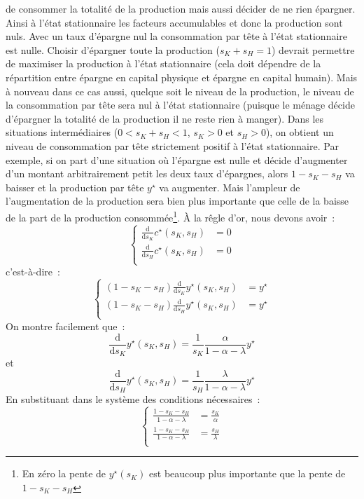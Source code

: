 \documentclass[10pt,a4paper,notitlepage,twocolumn]{article}
\begin{document}
de consommer la totalité de la production mais aussi décider de ne
rien épargner. Ainsi à l'état stationnaire les facteurs accumulables
et donc la production sont nuls. Avec un taux d'épargne nul la
consommation par tête à l'état stationnaire est nulle. Choisir
d'épargner toute la production ($s_K+s_H=1$) devrait permettre de
maximiser la production à l'état stationnaire (cela doit dépendre de
la répartition entre épargne en capital physique et épargne en capital
humain). Mais à nouveau dans ce cas aussi, quelque soit le niveau de
la production, le niveau de la consommation par tête sera nul à l'état
stationnaire (puisque le ménage décide d'épargner la totalité de la
production il ne reste rien à manger). Dans les situations
intermédiaires ($0<s_K+s_H<1$, $s_K>0$ et $s_H>0$), on obtient un
niveau de consommation par tête strictement positif à l'état
stationnaire. Par exemple, si on part d'une situation où l'épargne est
nulle et décide d'augmenter d'un montant arbitrairement petit les deux
taux d'épargnes, alors $1-s_K-s_H$ va baisser et la production par
tête $y^{\star}$ va augmenter. Mais l'ampleur de l'augmentation de la
production sera bien plus importante que celle de la baisse de la part
de la production consommée\footnote{En zéro la pente de
  $y^{\star}(s_K)$ est beaucoup plus importante que la pente de
  $1-s_K-s_H$}. À la rêgle d'or, nous devons avoir :
\[
  \begin{cases}
    \frac{\mathrm d}{\mathrm ds_K}c^{\star}(s_K, s_H) &= 0\\
    \frac{\mathrm d}{\mathrm ds_H}c^{\star}(s_K, s_H) &= 0\\
  \end{cases}
\]
c'est-à-dire :
\[
  \begin{cases}
    (1-s_K-s_H)\frac{\mathrm d}{\mathrm ds_K}y^{\star}(s_K, s_H) &= y^{\star}\\
    (1-s_K-s_H)\frac{\mathrm d}{\mathrm ds_H}y^{\star}(s_K, s_H) &= y^{\star}\\
  \end{cases}
\]
On montre facilement que :
\[
\frac{\mathrm d}{\mathrm ds_K}y^{\star}(s_K, s_H) = \frac{1}{s_K}\frac{\alpha}{1-\alpha-\lambda}y^{\star}
\]
et
\[
\frac{\mathrm d}{\mathrm ds_H}y^{\star}(s_K, s_H) = \frac{1}{s_H}\frac{\lambda}{1-\alpha-\lambda}y^{\star}
\]
En substituant dans le système des conditions nécessaires :
\[
  \begin{cases}
    \frac{1-s_K-s_H}{1-\alpha-\lambda} &= \frac{s_K}{\alpha}\\
    \frac{1-s_K-s_H}{1-\alpha-\lambda} &= \frac{s_H}{\lambda}\\
  \end{cases}
\]
\end{document}
